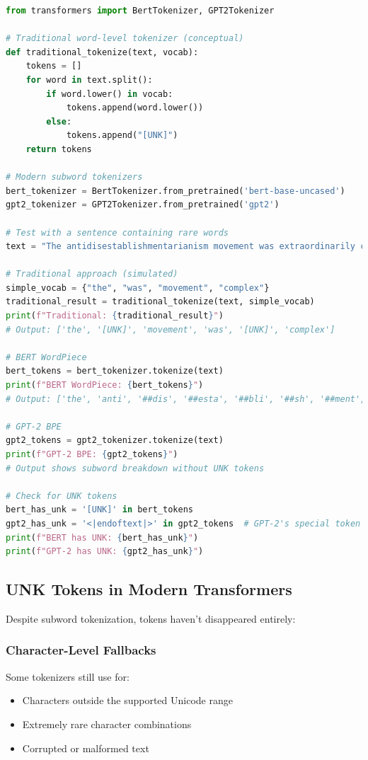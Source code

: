 \begin{lstlisting}[language=Python, caption=Subword vs Traditional Tokenization]
from transformers import BertTokenizer, GPT2Tokenizer

# Traditional word-level tokenizer (conceptual)
def traditional_tokenize(text, vocab):
    tokens = []
    for word in text.split():
        if word.lower() in vocab:
            tokens.append(word.lower())
        else:
            tokens.append("[UNK]")
    return tokens

# Modern subword tokenizers
bert_tokenizer = BertTokenizer.from_pretrained('bert-base-uncased')
gpt2_tokenizer = GPT2Tokenizer.from_pretrained('gpt2')

# Test with a sentence containing rare words
text = "The antidisestablishmentarianism movement was extraordinarily complex"

# Traditional approach (simulated)
simple_vocab = {"the", "was", "movement", "complex"}
traditional_result = traditional_tokenize(text, simple_vocab)
print(f"Traditional: {traditional_result}")
# Output: ['the', '[UNK]', 'movement', 'was', '[UNK]', 'complex']

# BERT WordPiece
bert_tokens = bert_tokenizer.tokenize(text)
print(f"BERT WordPiece: {bert_tokens}")
# Output: ['the', 'anti', '##dis', '##esta', '##bli', '##sh', '##ment', '##arian', '##ism', 'movement', 'was', 'extraordinary', 'complex']

# GPT-2 BPE
gpt2_tokens = gpt2_tokenizer.tokenize(text)
print(f"GPT-2 BPE: {gpt2_tokens}")
# Output shows subword breakdown without UNK tokens

# Check for UNK tokens
bert_has_unk = '[UNK]' in bert_tokens
gpt2_has_unk = '<|endoftext|>' in gpt2_tokens  # GPT-2's special token
print(f"BERT has UNK: {bert_has_unk}")
print(f"GPT-2 has UNK: {gpt2_has_unk}")
\end{lstlisting}

\subsection{UNK Tokens in Modern Transformers}

Despite subword tokenization, \unk{} tokens haven't disappeared entirely:

\subsubsection{Character-Level Fallbacks}
Some tokenizers still use \unk{} for:
\begin{itemize}
\item Characters outside the supported Unicode range
\item Extremely rare character combinations
\item Corrupted or malformed text
\end{itemize}

